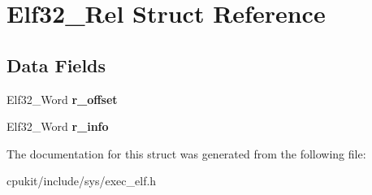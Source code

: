\hypertarget{structElf32__Rel}{}\section{Elf32\+\_\+\+Rel Struct Reference}
\label{structElf32__Rel}
\subsection*{Data Fields}
\begin{DoxyCompactItemize}
\item 
\mbox{\label{structElf32__Rel_ae75e57897476ff308f19920919230cb8}} 
Elf32\+\_\+\+Word {\bfseries r\+\_\+offset}
\item 
\mbox{\label{structElf32__Rel_a81c52bb1589056c5d37d58b9bfe2a046}} 
Elf32\+\_\+\+Word {\bfseries r\+\_\+info}
\end{DoxyCompactItemize}


The documentation for this struct was generated from the following file\+:\begin{DoxyCompactItemize}
\item 
cpukit/include/sys/exec\+\_\+elf.\+h\end{DoxyCompactItemize}
